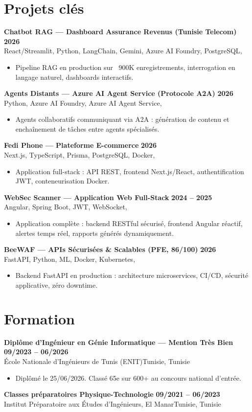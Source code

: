 \documentclass[a4paper,9pt]{article}
\newcommand{\cventry}[4]{\textbf{#1} \hfill \textbf{#4}\\[0.2pt]#2{\ifx\relax#3\relax\else, #3\fi}\par\vspace{0.3pt}}
\begin{document}
\section{Projets clés}
\cventry{Chatbot RAG --- Dashboard Assurance Revenus (Tunisie Telecom)}{React/Streamlit, Python, LangChain, Gemini, Azure AI Foundry, PostgreSQL}{}{2026}
\begin{itemize}
  \item Pipeline RAG en production sur ~900K enregistrements, interrogation en langage naturel, dashboards interactifs.
\end{itemize}
\cventry{Agents Distants --- Azure AI Agent Service (Protocole A2A)}{Python, Azure AI Foundry, Azure AI Agent Service}{}{2026}
\begin{itemize}
  \item Agents collaboratifs communiquant via A2A : génération de contenu et enchaînement de tâches entre agents spécialisés.
\end{itemize}
\cventry{Fedi Phone --- Plateforme E-commerce}{Next.js, TypeScript, Prisma, PostgreSQL, Docker}{}{2026}
\begin{itemize}
  \item Application full-stack : API REST, frontend Next.js/React, authentification JWT, conteneurisation Docker.
\end{itemize}
\cventry{WebSec Scanner --- Application Web Full-Stack}{Angular, Spring Boot, JWT, WebSocket}{}{2024 -- 2025}
\begin{itemize}
  \item Application complète : backend RESTful sécurisé, frontend Angular réactif, alertes temps réel, rapports générés dynamiquement.
\end{itemize}
\cventry{BeeWAF --- APIs Sécurisées \& Scalables (PFE, 86/100)}{FastAPI, Python, ML, Docker, Kubernetes}{}{2026}
\begin{itemize}
  \item Backend FastAPI en production : architecture microservices, CI/CD, sécurité applicative, zéro downtime.
\end{itemize}
\section{Formation}
\cventry{Diplôme d'Ingénieur en Génie Informatique --- Mention Très Bien}{École Nationale d'Ingénieurs de Tunis (ENIT)}{Tunisie}{09/2023 -- 06/2026}
\begin{itemize}
  \item Diplômé le 25/06/2026. Classé 65e sur 600+ au concours national d'entrée.
\end{itemize}
\cventry{Classes préparatoires Physique-Technologie}{Institut Préparatoire aux Études d'Ingénieurs, El Manar}{Tunisie}{09/2021 -- 06/2023}
\end{document}
